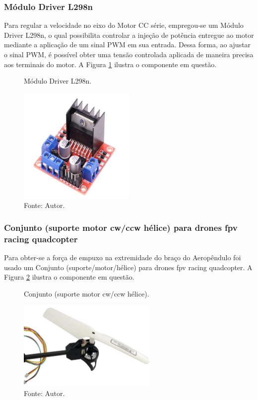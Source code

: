 \subsubsection{Módulo Driver L298n}

Para regular a velocidade no eixo do Motor CC série, empregou-se um Módulo Driver L298n, o qual possibilita controlar a injeção de potência entregue ao motor mediante a aplicação de um sinal PWM em sua entrada. Dessa forma, ao ajustar o sinal PWM, é possível obter uma tensão controlada aplicada de maneira precisa aos terminais do motor. A Figura \ref{fig3:image_07} ilustra o componente em questão.

\begin{figure}[!h]
	\centering
	\caption{Módulo Driver L298n.}
	\includegraphics[width=0.5\textwidth]{Capitulos/3_simulacao_e_prototipo/3_figuras/f4_ponteH.pdf}
	\caption*{Fonte: Autor.}
	\label{fig3:image_07}
\end{figure}


\subsubsection{Conjunto (suporte motor cw/ccw hélice) para drones fpv racing quadcopter}

Para obter-se a força de empuxo na extremidade do braço do Aeropêndulo foi usado um Conjunto (suporte/motor/hélice) para drones fpv racing quadcopter. A Figura \ref{fig3:image_08} ilustra o componente em questão.


\begin{figure}[!h]
	\centering
	\caption{Conjunto (suporte motor cw/ccw hélice).}
	\includegraphics[width=0.6\textwidth]{Capitulos/3_simulacao_e_prototipo/3_figuras/f1_braco_aerop.pdf}
	\caption*{Fonte: Autor.}
	\label{fig3:image_08}
\end{figure}

